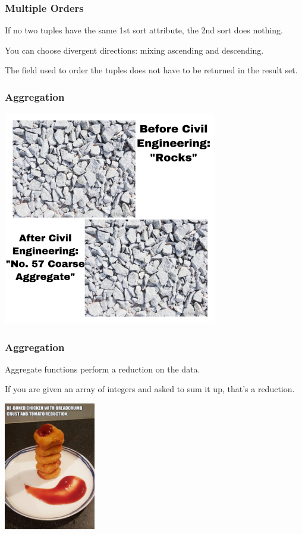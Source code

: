 \begin{frame}
\frametitle{Multiple Orders}

If no two tuples have the same 1st sort attribute, the 2nd sort does nothing.

You can choose divergent directions: mixing ascending and descending.

The field used to order the tuples does not have to be returned in the result set.


\end{frame}



\begin{frame}
\frametitle{Aggregation}

\begin{center}
	\includegraphics[width=0.7\textwidth]{images/civileng.jpg}
\end{center}


\end{frame}



\begin{frame}
\frametitle{Aggregation}

Aggregate functions perform a reduction on the data. 

If you are given an array of integers and asked to sum it up, that's a reduction. 

\begin{center}
	\includegraphics[width=0.3\textwidth]{images/reduction.jpg}
\end{center}

\end{frame}



